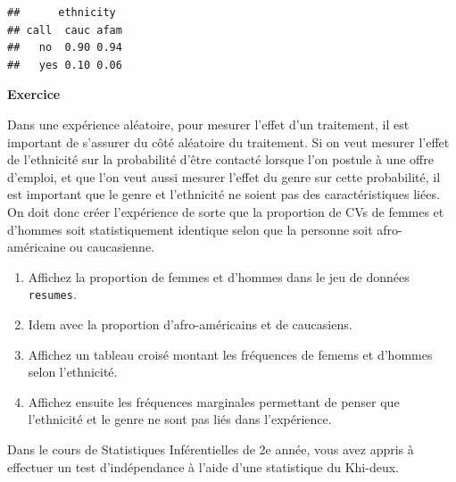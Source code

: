 \documentclass[
  11pt,
]{book}
\newenvironment{Shaded}{\begin{snugshade}}{\end{snugshade}}
\newcommand{\AttributeTok}[1]{\textcolor[rgb]{0.77,0.63,0.00}{#1}}
\newcommand{\DecValTok}[1]{\textcolor[rgb]{0.00,0.00,0.81}{#1}}
\newcommand{\FunctionTok}[1]{\textcolor[rgb]{0.00,0.00,0.00}{#1}}
\newcommand{\NormalTok}[1]{#1}
\newcommand{\OtherTok}[1]{\textcolor[rgb]{0.56,0.35,0.01}{#1}}
\newcommand{\SpecialCharTok}[1]{\textcolor[rgb]{0.00,0.00,0.00}{#1}}
\providecommand{\tightlist}{%
  \setlength{\itemsep}{0pt}\setlength{\parskip}{0pt}}
\numberwithin{equation}{section}
\numberwithin{countremarque}{section}
\newenvironment{greenbox}{
  \begin{tcolorbox}[breakable, colback=vert,coltext=black,
                  colframe=grisfonce]}
 {\end{tcolorbox}}
\begin{document}
\begin{lstlisting}
##      ethnicity
## call  cauc afam
##   no  0.90 0.94
##   yes 0.10 0.06
\end{lstlisting}

\begin{greenbox}

\textbf{Exercice}

Dans une expérience aléatoire, pour mesurer l'effet d'un traitement, il est important de s'assurer du côté aléatoire du traitement. Si on veut mesurer l'effet de l'ethnicité sur la probabilité d'être contacté lorsque l'on postule à une offre d'emploi, et que l'on veut aussi mesurer l'effet du genre sur cette probabilité, il est important que le genre et l'ethnicité ne soient pas des caractéristiques liées. On doit donc créer l'expérience de sorte que la proportion de CVs de femmes et d'hommes soit statistiquement identique selon que la personne soit afro-américaine ou caucasienne.

\begin{enumerate}
\def\labelenumi{\arabic{enumi}.}
\tightlist
\item
  Affichez la proportion de femmes et d'hommes dans le jeu de données \texttt{resumes}.
\item
  Idem avec la proportion d'afro-américains et de caucasiens.
\item
  Affichez un tableau croisé montant les fréquences de femems et d'hommes selon l'ethnicité.
\item
  Affichez ensuite les fréquences marginales permettant de penser que l'ethnicité et le genre ne sont pas liés dans l'expérience.
\end{enumerate}

\end{greenbox}

Dans le cours de Statistiques Inférentielles de 2e année, vous avez appris à effectuer un test d'indépendance à l'aide d'une statistique du Khi-deux.

\begin{Shaded}
\end{Shaded}
\end{document}
